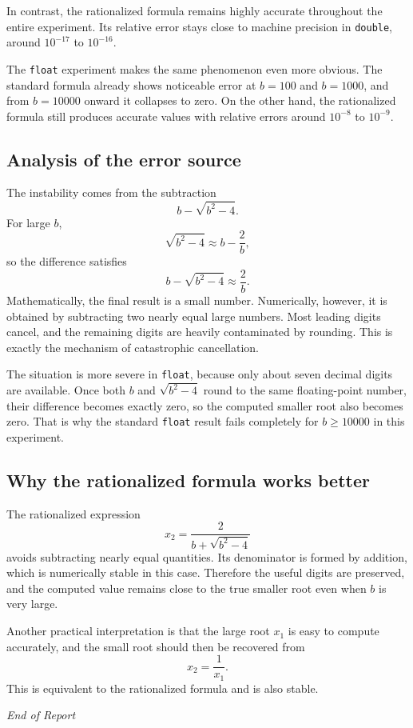 \documentclass[12pt,a4paper]{article}
\begin{document}
In contrast, the rationalized formula remains highly accurate throughout the entire experiment. Its relative error stays close to machine precision in \texttt{double}, around $10^{-17}$ to $10^{-16}$.

The \texttt{float} experiment makes the same phenomenon even more obvious. The standard formula already shows noticeable error at $b=100$ and $b=1000$, and from $b=10000$ onward it collapses to zero. On the other hand, the rationalized formula still produces accurate values with relative errors around $10^{-8}$ to $10^{-9}$.

\subsection*{Analysis of the error source}

The instability comes from the subtraction
\[
 b-\sqrt{b^2-4}.
\]
For large $b$,
\[
 \sqrt{b^2-4}\approx b-\frac{2}{b},
\]
so the difference satisfies
\[
 b-\sqrt{b^2-4}\approx \frac{2}{b}.
\]
Mathematically, the final result is a small number. Numerically, however, it is obtained by subtracting two nearly equal large numbers. Most leading digits cancel, and the remaining digits are heavily contaminated by rounding. This is exactly the mechanism of catastrophic cancellation.

The situation is more severe in \texttt{float}, because only about seven decimal digits are available. Once both $b$ and $\sqrt{b^2-4}$ round to the same floating-point number, their difference becomes exactly zero, so the computed smaller root also becomes zero. That is why the standard \texttt{float} result fails completely for $b\ge 10000$ in this experiment.

\subsection*{Why the rationalized formula works better}

The rationalized expression
\[
 x_2=\frac{2}{b+\sqrt{b^2-4}}
\]
avoids subtracting nearly equal quantities. Its denominator is formed by addition, which is numerically stable in this case. Therefore the useful digits are preserved, and the computed value remains close to the true smaller root even when $b$ is very large.

Another practical interpretation is that the large root $x_1$ is easy to compute accurately, and the small root should then be recovered from
\[
 x_2=\frac{1}{x_1}.
\]
This is equivalent to the rationalized formula and is also stable.

\vfill
\begin{center}
    \textit{End of Report}
\end{center}
\end{document}
